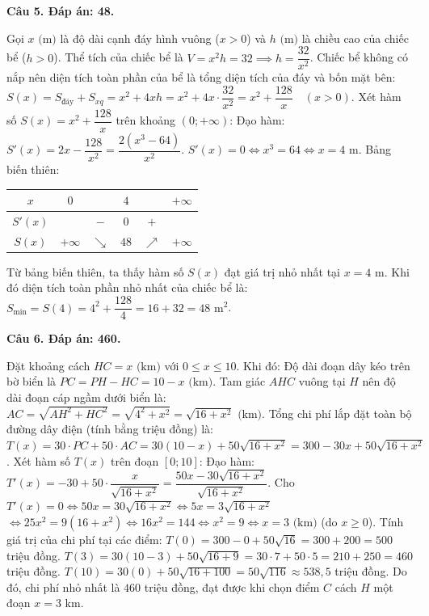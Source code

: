 \documentclass[12pt,a4paper]{article}
\newcommand{\loigiai}[1]{\par\medskip\Needspace{4\baselineskip}\noindent\textbf{#1}\par\nobreak}
\begin{document}
\loigiai{Câu 5. Đáp án: 48.}
Gọi $x\text{ (m)}$ là độ dài cạnh đáy hình vuông ($x>0$) và $h\text{ (m)}$ là chiều cao của chiếc bể ($h>0$).
Thể tích của chiếc bể là $V=x^2 h = 32 \implies h = \dfrac{32}{x^2}$.
Chiếc bể không có nắp nên diện tích toàn phần của bể là tổng diện tích của đáy và bốn mặt bên:
$S(x) = S_{\text{đáy}} + S_{xq} = x^2 + 4xh = x^2 + 4x\cdot\dfrac{32}{x^2} = x^2 + \dfrac{128}{x}\quad (x>0)$.
Xét hàm số $S(x)=x^2+\dfrac{128}{x}$ trên khoảng $(0;+\infty)$:
Đạo hàm: $S'(x)=2x-\dfrac{128}{x^2} = \dfrac{2(x^3-64)}{x^2}$.
$S'(x)=0 \iff x^3=64 \iff x=4\text{ m}$.
Bảng biến thiên:
\begin{center}
\begin{tabular}{c|ccccc}
$x$ & $0$ & & $4$ & & $+\infty$ \\ \hline
$S'(x)$ & & $-$ & $0$ & $+$ & \\ \hline
$S(x)$ & $+\infty$ & $\searrow$ & $48$ & $\nearrow$ & $+\infty$
\end{tabular}
\end{center}
Từ bảng biến thiên, ta thấy hàm số $S(x)$ đạt giá trị nhỏ nhất tại $x=4\text{ m}$.
Khi đó diện tích toàn phần nhỏ nhất của chiếc bể là:
$S_{\min} = S(4) = 4^2 + \dfrac{128}{4} = 16 + 32 = 48\text{ m}^2$.

\loigiai{Câu 6. Đáp án: 460.}
Đặt khoảng cách $HC=x\text{ (km)}$ với $0\le x\le 10$.
Khi đó:
Độ dài đoạn dây kéo trên bờ biển là $PC = PH - HC = 10 - x\text{ (km)}$.
Tam giác $AHC$ vuông tại $H$ nên độ dài đoạn cáp ngầm dưới biển là:
$AC = \sqrt{AH^2 + HC^2} = \sqrt{4^2 + x^2} = \sqrt{16 + x^2}\text{ (km)}$.
Tổng chi phí lắp đặt toàn bộ đường dây điện (tính bằng triệu đồng) là:
$T(x) = 30\cdot PC + 50\cdot AC = 30(10-x) + 50\sqrt{16+x^2} = 300 - 30x + 50\sqrt{16+x^2}$.
Xét hàm số $T(x)$ trên đoạn $[0;10]$:
Đạo hàm: $T'(x) = -30 + 50\cdot\dfrac{x}{\sqrt{16+x^2}} = \dfrac{50x - 30\sqrt{16+x^2}}{\sqrt{16+x^2}}$.
Cho $T'(x)=0 \iff 50x = 30\sqrt{16+x^2} \iff 5x = 3\sqrt{16+x^2}$
$\iff 25x^2 = 9(16+x^2) \iff 16x^2 = 144 \iff x^2 = 9 \iff x=3\text{ (km)}$ (do $x\ge 0$).
Tính giá trị của chi phí tại các điểm:
$T(0) = 300 - 0 + 50\sqrt{16} = 300 + 200 = 500$ triệu đồng.
$T(3) = 30(10-3) + 50\sqrt{16+9} = 30\cdot 7 + 50\cdot 5 = 210 + 250 = 460$ triệu đồng.
$T(10) = 30(0) + 50\sqrt{16+100} = 50\sqrt{116} \approx 538{,}5$ triệu đồng.
Do đó, chi phí nhỏ nhất là $460$ triệu đồng, đạt được khi chọn điểm $C$ cách $H$ một đoạn $x=3\text{ km}$.
\end{document}
